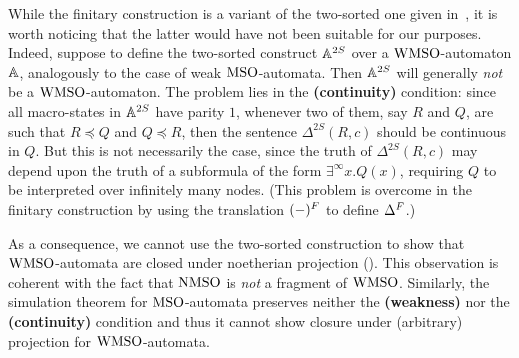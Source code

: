 \begin{remark}
While the finitary construction is a variant of the two-sorted one given
in~\cite{DBLP:conf/lics/FacchiniVZ13}, it is
worth noticing that the latter would have not been suitable for our purposes.
Indeed, suppose to define the two-sorted construct $\mathbb{A}^{2S}$ over a
$\mathrm{WMSO}$-automaton $\mathbb{A}$, analogously to the case of weak $\mathrm{MSO}$-automata.
Then $\mathbb{A}^{2S}$ will generally \emph{not} be a $\mathrm{WMSO}$-automaton.
The problem lies in the \textbf{(continuity)} condition: since all macro-states in
$\mathbb{A}^{2S}$ have parity $1$, whenever two of them, say $R$ and $Q$, are such that $R \preceq Q$ and $Q \preceq R$, then the sentence $\Delta^{2S}(R,c)$ should be continuous in $Q$. But this is not necessarily the case, since the truth of $\Delta^{2S}(R,c)$ may depend upon the truth of a subformula of the form $\exists^{\infty}x.Q(x)$, requiring $Q$ to be interpreted over infinitely many nodes. (This problem is overcome in the finitary construction by using the translation $(-)^{F}$ to define $\Delta^{F}$.)

As a consequence, we cannot use the two-sorted construction to show that
$\mathrm{WMSO}$-automata are closed under noetherian projection
(\cite[Def. 3]{DBLP:conf/lics/FacchiniVZ13}).
This observation is coherent with the fact that $\mathrm{NMSO}$ is \emph{not} a fragment of $\mathrm{WMSO}$. Similarly, the simulation theorem for $\mathrm{MSO}$-automata \cite{Walukiewicz96} preserves neither the \textbf{(weakness)} nor the \textbf{(continuity)} condition and thus it cannot show
closure under (arbitrary) projection for $\mathrm{WMSO}$-automata.\end{remark} 